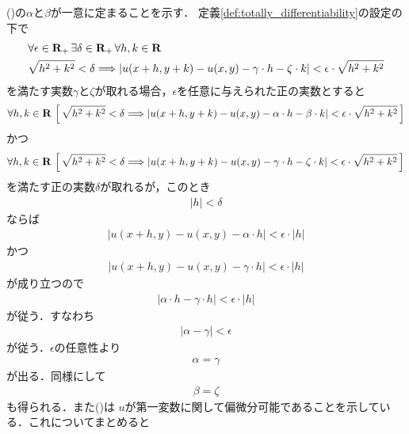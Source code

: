 	()の$\alpha$と$\beta$が一意に定まることを示す．
	定義\ref{def:totally_differentiability}の設定の下で
	\begin{align}
		&\forall \epsilon \in \mathbf{R}_+\, \exists \delta \in \mathbf{R}_+\, \forall h,k \in \mathbf{R}\, \\
		&\sqrt{h^2 + k^2} < \delta \Longrightarrow
		\left|u(x+h,y+k) - u(x,y) - \gamma \cdot h - \zeta \cdot k\right| 
		< \epsilon \cdot \sqrt{h^2 + k^2}
	\end{align}
	を満たす実数$\gamma$と$\zeta$が取れる場合，$\epsilon$を任意に与えられた正の実数とすると
	\begin{align}
		\forall h,k \in \mathbf{R}\,
		\left[\, \sqrt{h^2 + k^2} < \delta \Longrightarrow
		\left|u(x+h,y+k) - u(x,y) - \alpha \cdot h - \beta \cdot k\right| 
		< \epsilon \cdot \sqrt{h^2 + k^2}\, \right]
	\end{align}
	かつ
	\begin{align}
		\forall h,k \in \mathbf{R}\,
		\left[\, \sqrt{h^2 + k^2} < \delta \Longrightarrow
		\left|u(x+h,y+k) - u(x,y) - \gamma \cdot h - \zeta \cdot k\right| 
		< \epsilon \cdot \sqrt{h^2 + k^2}\, \right]
	\end{align}
	を満たす正の実数$\delta$が取れるが，このとき
	\begin{align}
		|h| < \delta
	\end{align}
	ならば
	\begin{align}
		\left|u(x+h,y) - u(x,y) - \alpha \cdot h\right| < \epsilon \cdot |h|
		\label{fom:totally_differentiable_then_partially_differentiable}
	\end{align}
	かつ
	\begin{align}
		\left|u(x+h,y) - u(x,y) - \gamma \cdot h\right| < \epsilon \cdot |h|
	\end{align}
	が成り立つので
	\begin{align}
		\left|\alpha \cdot h - \gamma \cdot h\right| < \epsilon \cdot |h|
	\end{align}
	が従う．すなわち
	\begin{align}
		\left|\alpha - \gamma\right| < \epsilon
	\end{align}
	が従う．$\epsilon$の任意性より
	\begin{align}
		\alpha = \gamma
	\end{align}
	が出る．同様にして
	\begin{align}
		\beta = \zeta
	\end{align}
	も得られる．また()は
	$u$が第一変数に関して偏微分可能であることを示している．これについてまとめると
	
